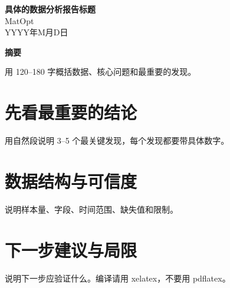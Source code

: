 \documentclass[11pt,a4paper]{article}
\title{\reporttitle}
\author{\reportauthor}
\date{\reportdate}
\newcommand{\reporttitle}{具体的数据分析报告标题}
\newcommand{\reportauthor}{MatOpt}
\newcommand{\reportdate}{YYYY年M月D日}
\begin{document}
\thispagestyle{firstpage}

\begin{center}
  \vspace*{2.6cm}
  {\LARGE \textbf{\reporttitle}} \\[0.55em]
  {\large \reportauthor} \\[0.45em]
  {\large \reportdate}
\end{center}

\vspace{1.1cm}
\begin{center}
\begin{minipage}{0.84\textwidth}
\centering
{\bfseries 摘要}\par
\vspace{0.45em}
\justifying
用 120--180 字概括数据、核心问题和最重要的发现。
\end{minipage}
\end{center}

\newpage

\section{先看最重要的结论}
用自然段说明 3--5 个最关键发现，每个发现都要带具体数字。

\section{数据结构与可信度}
说明样本量、字段、时间范围、缺失值和限制。

\section{下一步建议与局限}
说明下一步应验证什么。编译请用 xelatex，不要用 pdflatex。
\end{document}
